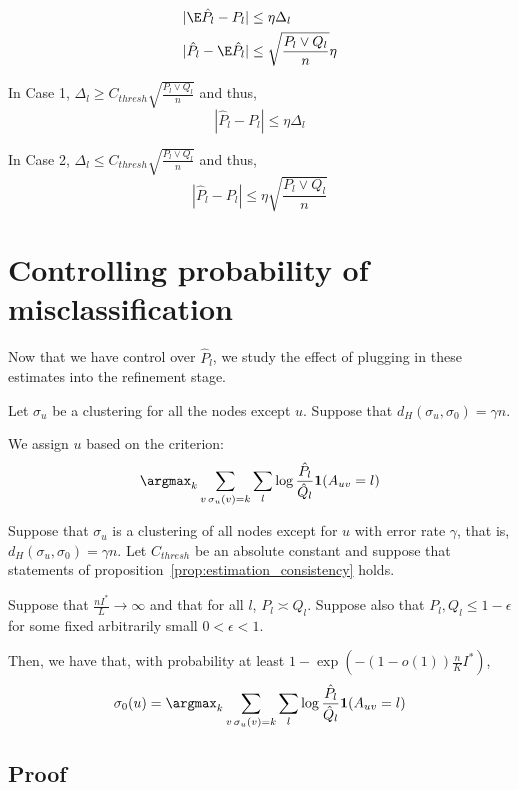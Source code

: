 \documentclass{article}
\begin{document}
\begin{align*}
| \E \hat{P}_l - P_l | &\leq \eta \Delta_l \\
| \hat{P}_l - \E \hat{P}_l | &\leq 
   \sqrt{ \frac{P_l \vee Q_l}{n} } \eta
\end{align*}

In Case 1, $\Delta_l \geq C_{thresh} \sqrt{ \frac{P_l \vee Q_l}{n}} $ and thus, 
\[
| \hat{P}_l - P_l| \leq \eta \Delta_l
\]

In Case 2, $\Delta_l \leq C_{thresh} \sqrt{ \frac{P_l \vee Q_l}{n}}$ and thus,
\[
| \hat{P}_l - P_l| \leq \eta \sqrt{ \frac{P_l \vee Q_l}{n}}
\]





\newpage
\section{Controlling probability of misclassification}
\label{sec:misclassify}
Now that we have control over $\hat{P}_l$, we study the effect of plugging in these estimates into the refinement stage.

Let $\sigma_u$ be a clustering for all the nodes except $u$. Suppose that $d_H(\sigma_u, \sigma_0) = \gamma n$. 


We assign $u$ based on the criterion:
\[
\argmax_k \sum_{v\, \sigma_u(v)=k} \sum_l \log \frac{\hat{P}_l}{\hat{Q}_l} \mathbf{1}(A_{uv} = l) 
\]

\begin{proposition}
Suppose that $\sigma_u$ is a clustering of all nodes except for $u$ with error rate $\gamma$, that is, $d_H(\sigma_u, \sigma_0) = \gamma n$. Let $C_{thresh}$ be an absolute constant and suppose that statements of proposition~\ref{prop:estimation_consistency} holds. 

Suppose that $\frac{n I^*}{L} \rightarrow \infty$ and that for all $l$, $P_l \asymp Q_l$.  Suppose also that $P_l, Q_l \leq 1 - \epsilon$ for some fixed arbitrarily small $0 < \epsilon < 1$. 

Then, we have that, with probability at least $1 - \exp \left( - (1 - o(1)) \frac{n}{K} I^* \right)$, 
\[
\sigma_0(u) = \argmax_k \sum_{v\, \sigma_u(v)=k} \sum_l \log \frac{\hat{P}_l}{\hat{Q}_l} \mathbf{1}(A_{uv} = l) 
\]

\end{proposition}




\subsection{Proof}
\end{document}
